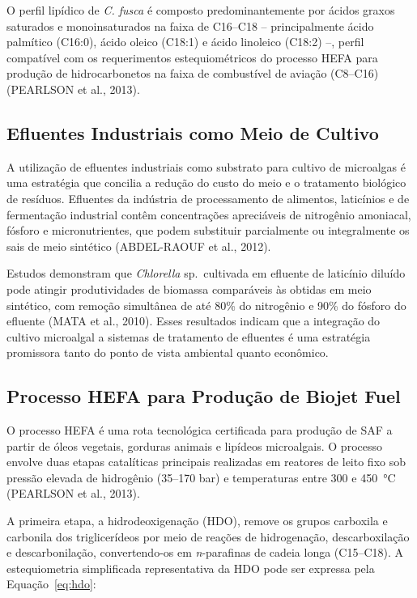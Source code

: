 O perfil lipídico de \textit{C. fusca} é composto predominantemente por
ácidos graxos saturados e monoinsaturados na faixa de C16--C18 --
principalmente ácido palmítico (C16:0), ácido oleico (C18:1) e ácido
linoleico (C18:2) --, perfil compatível com os requerimentos estequiométricos
do processo HEFA para produção de hidrocarbonetos na faixa de combustível de
aviação (C8--C16) (PEARLSON et al., 2013).

\subsection{Efluentes Industriais como Meio de Cultivo}

A utilização de efluentes industriais como substrato para cultivo de
microalgas é uma estratégia que concilia a redução do custo do meio e o
tratamento biológico de resíduos. Efluentes da indústria de processamento
de alimentos, laticínios e de fermentação industrial contêm concentrações
apreciáveis de nitrogênio amoniacal, fósforo e micronutrientes, que podem
substituir parcialmente ou integralmente os sais de meio sintético (ABDEL-RAOUF
et al., 2012).

Estudos demonstram que \textit{Chlorella} sp.\ cultivada em efluente de
laticínio diluído pode atingir produtividades de biomassa comparáveis às
obtidas em meio sintético, com remoção simultânea de até 80\% do nitrogênio
e 90\% do fósforo do efluente (MATA et al., 2010). Esses resultados indicam
que a integração do cultivo microalgal a sistemas de tratamento de efluentes
é uma estratégia promissora tanto do ponto de vista ambiental quanto
econômico.

\subsection{Processo HEFA para Produção de Biojet Fuel}

O processo HEFA é uma rota tecnológica certificada para produção de SAF a
partir de óleos vegetais, gorduras animais e lipídeos microalgais. O processo
envolve duas etapas catalíticas principais realizadas em reatores de leito
fixo sob pressão elevada de hidrogênio (35--170 bar) e temperaturas entre
300 e 450~°C (PEARLSON et al., 2013).

A primeira etapa, a hidrodeoxigenação (HDO), remove os grupos carboxila e
carbonila dos triglicerídeos por meio de reações de hidrogenação,
descarboxilação e descarbonilação, convertendo-os em \textit{n}-parafinas
de cadeia longa (C15--C18). A estequiometria simplificada representativa
da HDO pode ser expressa pela Equação~\ref{eq:hdo}:

